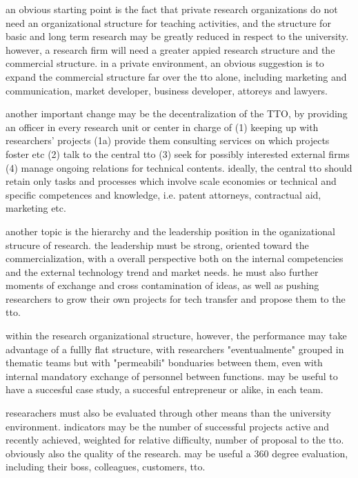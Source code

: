 an obvious starting point is the fact that private research organizations do not need an organizational structure for teaching activities, and the structure for basic and long term research may be greatly reduced in respect to the university. however, a research firm will need a greater appied research structure and the commercial structure. in a private environment, an obvious suggestion is to expand the commercial structure far over the tto alone, including marketing and communication, market developer, business developer, attoreys and lawyers.

another important change may be the decentralization of the TTO, by providing an officer in every research unit or center in charge of (1) keeping up with researchers' projects (1a) provide them consulting services on which projects foster etc (2) talk to the central tto (3) seek for possibly interested external firms (4) manage ongoing relations for technical contents. ideally, the central tto should retain only tasks and processes which involve scale economies or technical and specific competences and knowledge, i.e. patent attorneys, contractual aid, marketing etc.

another topic is the hierarchy and the leadership position in the oganizational strucure of research. the leadership must be strong, oriented toward the commercialization, with a overall perspective both on the internal competencies and the external technology trend and market needs. he must also further moments of exchange and cross contamination of ideas, as well as pushing researchers to grow their own projects for tech transfer and propose them to the tto.

within the research organizational structure, however, the performance may take advantage of a fullly flat structure, with researchers "eventualmente" grouped in thematic teams but with "permeabili" bonduaries between them, even with internal mandatory exchange of personnel between functions. may be useful to have a succesful case study, a succesful entrepreneur or alike, in each team.

researachers must also be evaluated through other means than the university environment. indicators may be the number of successful projects active and recently achieved, weighted for relative difficulty, number of proposal to the tto. obviously also the quality of the research. may be useful a 360 degree evaluation, including their boss, colleagues, customers, tto. 

